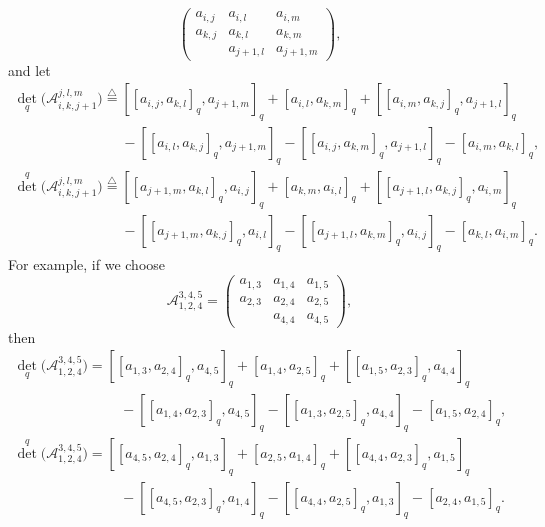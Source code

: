 \documentclass[pdftex]{sigma}
\numberwithin{equation}{section}
\def\A{\mathscr{A}}
\begin{document}
\begin{itemize}
\begin{equation}
\begin{pmatrix}
a_{i,j}& a_{i,l}& a_{i,m}\\
a_{k,j} & a_{k,l} & a_{k, m}\\
& a_{j+1,l} & a_{j+1,m }
 \end{pmatrix}
,
\end{equation}
and let
\begin{gather}
{\det}_q\bigl(\A_{i,k,j+1}^{j,l,m}\bigr)
 \overset{\bigtriangleup}{=} [ [a_{i, j}, a_{k, l} ]_q, a_{j+1, m} ]_q+ [a_{i,l},a_{k,m} ]_q+ [ [a_{i, m}, a_{k, j} ]_q, a_{j+1, l} ]_q \nonumber\\
\phantom{{\det}_q\bigl(\A_{i,k,j+1}^{j,l,m}\bigr)
 \overset{\bigtriangleup}{=}}{}
- [ [ a_{i, l }, a_{k,j} ]_q, a_{j+1, m} ]_q - [ [ a_{i, j}, a_{k, m} ]_q, a_{j+1, l} ]_q - [a_{i, m}, a_{k, l} ]_q, \label{eqn:D-1}\\
 {\det}^q\bigl(\A_{i,k,j+1}^{j,l,m}\bigr)
 \overset{\bigtriangleup}{=} [ [a_{j+1, m}, a_{k, l} ]_q, a_{i, j} ]_q+ [a_{k,m}, a_{i,l} ]_q + [ [a_{j+1, l}, a_{k, j} ]_q, a_{i, m} ]_q \nonumber\\
\phantom{ {\det}^q\bigl(\A_{i,k,j+1}^{j,l,m}\bigr)
 \overset{\bigtriangleup}{=}}{} - [ [ a_{j+1, m}, a_{k, j} ]_q, a_{i, l} ]_q - [ [a_{j+1, l}, a_{k, m} ]_q, a_{i, j} ]_q- [a_{k, l}, a_{i, m} ]_q. \label{eqn:D-2}
\end{gather}
For example, if we choose
\begin{equation*}
\A_{1,2,4}^{3,4,5}=
 \begin{pmatrix}
a_{1,3}& a_{1,4}& a_{1,5}\\
a_{2,3} & a_{2,4} & a_{2, 5}\\
& a_{4,4} & a_{4,5 }
 \end{pmatrix}
,
\end{equation*}
then
\begin{gather*}
 {\det}_q\bigl(\A_{1,2,4}^{3,4,5}\bigr)
= [ [a_{1, 3}, a_{2, 4} ]_q, a_{4, 5} ]_q+ [a_{1,4},a_{2,5} ]_q+ [ [a_{1, 5}, a_{2, 3} ]_q, a_{4, 4} ]_q \\
\phantom{ {\det}_q(\A_{1,2,4}^{3,4,5})
=}{}
- [ [ a_{1, 4 }, a_{2,3} ]_q, a_{4, 5} ]_q - [ [ a_{1, 3}, a_{2, 5} ]_q, a_{4, 4} ]_q - [a_{1, 5}, a_{2, 4} ]_q, \\
 {\det}^q\bigl(\A_{1,2,4}^{3,4,5}\bigr)
= [ [a_{4, 5}, a_{2, 4} ]_q, a_{1, 3} ]_q+ [a_{2,5}, a_{1,4} ]_q + [ [a_{4, 4}, a_{2, 3} ]_q, a_{1, 5} ]_q \\
 \phantom{ {\det}^q(\A_{1,2,4}^{3,4,5})
= }{}- [ [ a_{4, 5}, a_{2, 3} ]_q, a_{1, 4} ]_q - [ [a_{4, 4}, a_{2, 5} ]_q, a_{1, 3} ]_q- [a_{2, 4}, a_{1, 5} ]_q.
\end{gather*}
\end{itemize}
\end{document}
